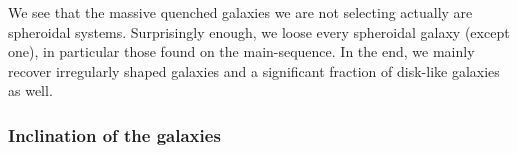 We see that the massive quenched galaxies we are not selecting actually are spheroidal systems. Surprisingly enough, we loose every spheroidal galaxy (except one), in particular those found on the main-sequence. In the end, we mainly recover irregularly shaped galaxies and a significant fraction of disk-like galaxies as well.

\subsubsection{Inclination of the galaxies}






 
